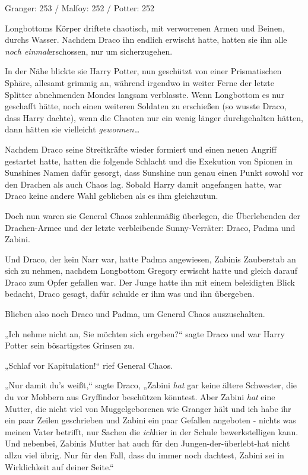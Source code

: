 {\later

Granger: 253 / Malfoy: 252 / Potter: 252

Longbottoms Körper driftete chaotisch, mit verworrenen Armen und Beinen, durchs Wasser. Nachdem Draco ihn endlich erwischt hatte, hatten sie ihn alle \emph{noch einmal}erschossen, nur um sicherzugehen.

In der Nähe blickte sie Harry Potter, nun geschützt von einer Prismatischen Sphäre, allesamt grimmig an, während irgendwo in weiter Ferne der letzte Splitter abnehmenden Mondes langsam verblasste. Wenn Longbottom es nur geschafft hätte, noch einen weiteren Soldaten zu erschießen (so wusste Draco, dass Harry dachte), wenn die Chaoten nur ein wenig länger durchgehalten hätten, dann hätten sie vielleicht \emph{gewonnen…}

Nachdem Draco seine Streitkräfte wieder formiert und einen neuen Angriff gestartet hatte, hatten die folgende Schlacht und die Exekution von Spionen in Sunshines Namen dafür gesorgt, dass Sunshine nun genau einen Punkt sowohl vor den Drachen als auch Chaos lag. Sobald Harry damit angefangen hatte, war Draco keine andere Wahl geblieben als es ihm gleichzutun.

Doch nun waren sie General Chaos zahlenmäßig überlegen, die Überlebenden der Drachen-Armee und der letzte verbleibende Sunny-Verräter: Draco, Padma und Zabini.

Und Draco, der kein Narr war, hatte Padma angewiesen, Zabinis Zauberstab an sich zu nehmen, nachdem Longbottom Gregory erwischt hatte und gleich darauf Draco zum Opfer gefallen war. Der Junge hatte ihn mit einem beleidigten Blick bedacht, Draco gesagt, dafür schulde er ihm was und ihn übergeben.

Blieben also noch Draco und Padma, um General Chaos auszuschalten.

„Ich nehme nicht an, Sie möchten sich ergeben?“ sagte Draco und war Harry Potter sein bösartigstes Grinsen zu.

„Schlaf vor Kapitulation!“ rief General Chaos.

„Nur damit du's weißt,“ sagte Draco, „Zabini \emph{hat} gar keine ältere Schwester, die du vor Mobbern aus Gryffindor beschützen könntest. Aber Zabini \emph{hat} eine Mutter, die nicht viel von Muggelgeborenen wie Granger hält und ich habe ihr ein paar Zeilen geschrieben und Zabini ein paar Gefallen angeboten - nichts was meinen Vater betrifft, nur Sachen die \emph{ich}hier in der Schule bewerkstelligen kann. Und nebenbei, Zabinis Mutter hat auch für den Jungen-der-überlebt-hat nicht allzu viel übrig. Nur für den Fall, dass du immer noch dachtest, Zabini sei in Wirklichkeit auf deiner Seite.“

}
